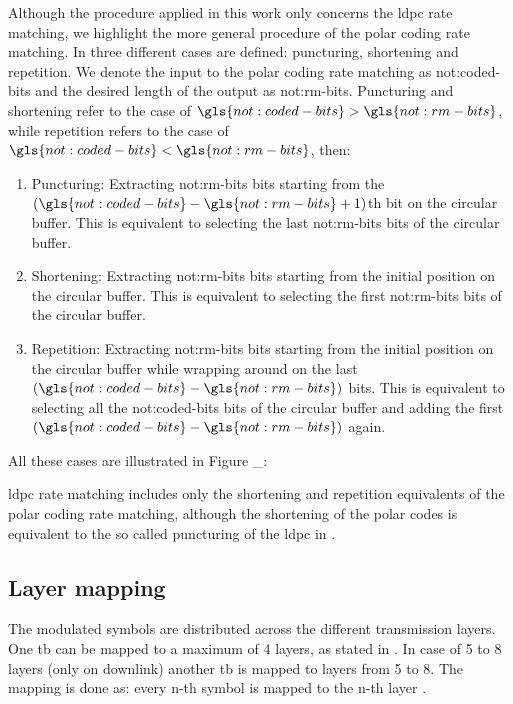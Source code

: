 Although the procedure applied in this work only concerns the \gls{ldpc} rate matching, we highlight the more general procedure of the polar coding rate matching.
%
In \cite{Hui2018} three different cases are defined: puncturing, shortening and repetition.
%
We denote the input to the polar coding rate matching as \gls{not:coded-bits} and the desired length of the output as \gls{not:rm-bits}.
%
Puncturing and shortening refer to the case of $\gls{not:coded-bits} > \gls{not:rm-bits}$, while repetition refers to the case of $\gls{not:coded-bits} < \gls{not:rm-bits}$, then:
%
\begin{enumerate}
    \item Puncturing: Extracting \gls{not:rm-bits} bits starting from the $(\gls{not:coded-bits} - \gls{not:rm-bits} + 1)$th bit on the circular buffer. This is equivalent to selecting the last \gls{not:rm-bits} bits of the circular buffer.
    \item Shortening: Extracting \gls{not:rm-bits} bits starting from the initial position on the circular buffer. This is equivalent to selecting the first \gls{not:rm-bits} bits of the circular buffer.
    \item Repetition: Extracting \gls{not:rm-bits} bits starting from the initial position on the circular buffer while wrapping around on the last $(\gls{not:coded-bits} - \gls{not:rm-bits})$ bits. This is equivalent to selecting all the \gls{not:coded-bits} bits of the circular buffer and adding the first $(\gls{not:coded-bits} - \gls{not:rm-bits})$ again.
\end{enumerate}
%
All these cases are illustrated in Figure \_:

\Gls{ldpc} rate matching includes only the shortening and repetition equivalents of the polar coding rate matching, although the shortening of the polar codes is equivalent to the so called puncturing of the \gls{ldpc} in \cite{Hui2018}.
%


\subsection{Layer mapping}

The modulated symbols are distributed across the different transmission layers.
%
One \gls{tb} can be mapped to a maximum of 4 layers, as stated in  \cite[Table 7.3.1.3]{3gpp.38.211}.
%
In case of 5 to 8 layers (only on downlink) another \gls{tb} is mapped to layers from 5 to 8.
%
The mapping is done as: every n-th symbol is mapped to the n-th layer \cite{ErikDahlman5G}.

